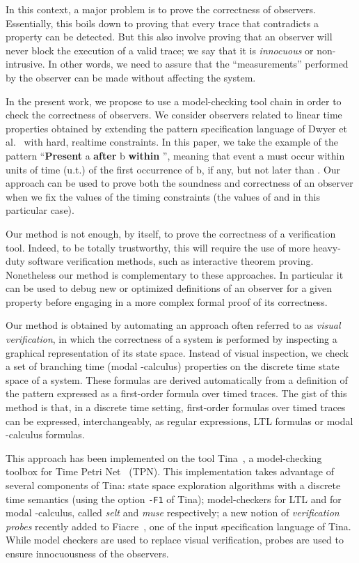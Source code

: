 \documentclass[a4paper]{scrartcl}
\def\code#1{\textsf{\small\bfseries #1}}
\def\vars#1{\textsf{\small #1}}
\begin{document}
In this context, a major problem is to prove the correctness of
observers. Essentially, this boils down to proving that every trace
that contradicts a property can be detected. But this also involve
proving that an observer will never block the execution of a valid
trace; we say that it is \emph{innocuous} or non-intrusive. In other
words, we need to assure that the ``measurements'' performed by the
observer can be made without affecting the system.

In the present work, we propose to use a model-checking tool chain in
order to check the correctness of observers. We consider observers
related to linear time properties obtained by extending the pattern
specification language of Dwyer et al.~\cite{ksu} with hard, realtime
constraints. In this paper, we take the example of the pattern
``\code{Present} \vars{a} \code{after} \vars{b} \code{within} '', meaning that event \vars{a} must occur within  units of
time (u.t.) of the first occurrence of \vars{b}, if any, but not later
than . Our approach can be used to prove both the soundness and
correctness of an observer when we fix the values of the timing
constraints (the values of  and  in this particular
case). 

Our method is not enough, by itself, to prove the correctness of a
verification tool. Indeed, to be totally trustworthy, this will
require the use of more heavy-duty software verification methods, such
as interactive theorem proving. Nonetheless our method is
complementary to these approaches. In particular it can be used to
debug new or optimized definitions of an observer for a given property
before engaging in a more complex formal proof of its correctness.

Our method is obtained by automating an approach often referred to as
\emph{visual verification}, in which the correctness of a system is
performed by inspecting a graphical representation of its state
space. Instead of visual inspection, we check a set of branching time
(modal -calculus) properties on the discrete time state space of
a system. These formulas are derived automatically from a definition
of the pattern expressed as a first-order formula over timed
traces. The gist of this method is that, in a discrete time setting,
first-order formulas over timed traces can be expressed,
interchangeably, as regular expressions, LTL formulas or modal
-calculus formulas.

This approach has been implemented on the tool Tina~\cite{tina}, a
model-checking toolbox for Time Petri Net~\cite{merlin} (TPN). This
implementation takes advantage of several components of Tina: state
space exploration algorithms with a discrete time semantics (using the
option \texttt{-F1} of Tina); model-checkers for LTL and for modal
-calculus, called \emph{selt} and \emph{muse} respectively; a new
notion of \emph{verification probes} recently added to
Fiacre~\cite{Fiacre07,filfmvte2008}, one of the input specification
language of Tina. While model checkers are used to replace visual
verification, probes are used to ensure innocuousness of the
observers.
\end{document}
